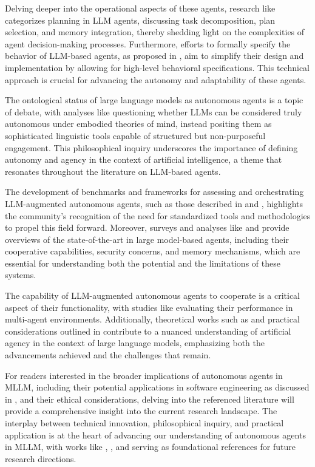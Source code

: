 \documentclass[conference]{IEEEtran}
\begin{document}
Delving deeper into the operational aspects of these agents, research like \cite{2402.02716} categorizes planning in LLM agents, discussing task decomposition, plan selection, and memory integration, thereby shedding light on the complexities of agent decision-making processes. Furthermore, efforts to formally specify the behavior of LLM-based agents, as proposed in \cite{2310.08535}, aim to simplify their design and implementation by allowing for high-level behavioral specifications. This technical approach is crucial for advancing the autonomy and adaptability of these agents.

The ontological status of large language models as autonomous agents is a topic of debate, with analyses like \cite{2407.10735} questioning whether LLMs can be considered truly autonomous under embodied theories of mind, instead positing them as sophisticated linguistic tools capable of structured but non-purposeful engagement. This philosophical inquiry underscores the importance of defining autonomy and agency in the context of artificial intelligence, a theme that resonates throughout the literature on LLM-based agents.

The development of benchmarks and frameworks for assessing and orchestrating LLM-augmented autonomous agents, such as those described in \cite{2308.05960} and \cite{2309.07870}, highlights the community's recognition of the need for standardized tools and methodologies to propel this field forward. Moreover, surveys and analyses like \cite{2409.14457} and \cite{2404.13501} provide overviews of the state-of-the-art in large model-based agents, including their cooperative capabilities, security concerns, and memory mechanisms, which are essential for understanding both the potential and the limitations of these systems.

The capability of LLM-augmented autonomous agents to cooperate is a critical aspect of their functionality, with studies like \cite{2403.11381} evaluating their performance in multi-agent environments. Additionally, theoretical works such as \cite{2407.16190} and practical considerations outlined in \cite{2412.04093} contribute to a nuanced understanding of artificial agency in the context of large language models, emphasizing both the advancements achieved and the challenges that remain.

For readers interested in the broader implications of autonomous agents in MLLM, including their potential applications in software engineering as discussed in \cite{2404.13501}, and their ethical considerations, delving into the referenced literature will provide a comprehensive insight into the current research landscape. The interplay between technical innovation, philosophical inquiry, and practical application is at the heart of advancing our understanding of autonomous agents in MLLM, with works like \cite{2308.11432}, \cite{2402.02716}, and \cite{2310.08535} serving as foundational references for future research directions.
\end{document}
